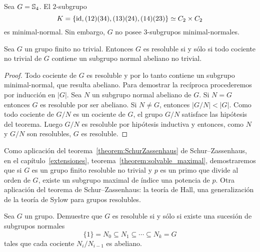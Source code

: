 \begin{example}
	Sea $G=\mathbb{S}_4$. El $2$-subgrupo 
	\[
	K=\{\operatorname{id},(12)(34),(13)(24),(14)(23)\}\simeq
	C_2\times C_2
	\]
	es minimal-normal. Sin embargo, $G$ no posee $3$-subgrupos
	minimal-normales. 
\end{example}

\begin{theorem}
	Sea $G$ un grupo finito no trivial. Entonces $G$ es resoluble si y sólo si
	todo cociente no trivial de $G$ contiene un subgrupo normal abeliano no
	trivial.
\end{theorem}

\begin{proof}
	Todo cociente de $G$ es resoluble y por lo tanto contiene un subgrupo
	minimal-normal, que resulta abeliano. Para demostrar la recíproca
	procederemos por inducción en $|G|$. Sea $N$ un subgrupo normal abeliano de
	$G$. Si $N=G$ entonces $G$ es resoluble por ser abeliano. Si $N\ne G$,
	entonces $|G/N|<|G|$. Como todo cociente de $G/N$ es un cociente de $G$, el
	grupo $G/N$ satisface las hipótesis del teorema. Luego $G/N$ es resoluble
	por hipótesis inductiva y entonces, como $N$ y $G/N$ son resolubles, $G$ es
	resoluble.
\end{proof}

Como aplicación del teorema~\ref{theorem:SchurZassenhaus} de
Schur--Zassenhaus, en el capítulo~\ref{extensiones},
teorema~\ref{theorem:solvable_maximal}, demostraremos que si $G$ es un
grupo finito resoluble no trivial y $p$ es un primo que divide al orden de
$G$, existe un subgrupo maximal de índice una potencia de $p$. 
Otra aplicación del teorema de Schur--Zassenhaus: la teoría de Hall, 
una generalización de
la teoría de Sylow para grupos resolubles. 

\begin{exercise}
	\label{exercise:resoluble}
	Sea $G$ un grupo.  Demuestre que $G$ es resoluble si y sólo si existe una
	sucesión de subgrupos normales
	\[
		\{1\}=N_0\subseteq N_1\subseteq\cdots\subseteq N_k=G
	\]
	tales que cada cociente $N_i/N_{i-1}$ es abeliano.
\end{exercise}


